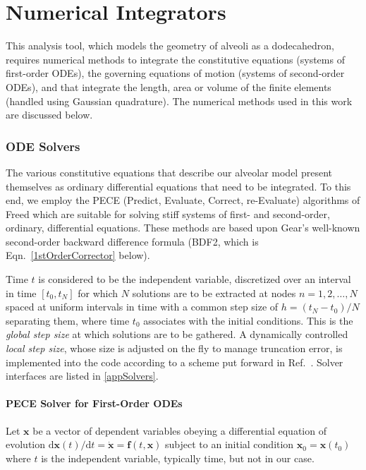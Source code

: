 \part{Numerical Integrators}
\label{partNumericalMethods}

This analysis tool, which models the geometry of alveoli as a dodecahedron, requires numerical methods to integrate the constitutive equations (systems of first-order ODEs), the governing equations of motion (systems of second-order ODEs), and that integrate the length, area or volume of the finite elements (handled using Gaussian quadrature).  The numerical methods used in this work are discussed below.

\section{ODE Solvers}

The various constitutive equations that describe our alveolar model present themselves as ordinary differential equations that need to be integrated.  To this end, we employ the PECE (Predict, Evaluate, Correct, re-Evaluate) algorithms of Freed \cite{Freed17a} which are suitable for solving stiff systems of first- and second-order, ordinary, differential equations.  These methods are based upon Gear's well-known second-order backward difference formula (BDF2, which is Eqn.~\ref{1stOrderCorrector} below).

Time $t$ is considered to be the independent variable, discretized over an interval in time $[t_0, t_N]$ for which $N$ solutions are to be extracted at nodes $n=1, 2, \ldots, N$ spaced at uniform intervals in time with a common step size of $h = (t_N - t_0)/N$ separating them, where time $t_0$ associates with the initial conditions.  This is the \textit{global step size\/} at which solutions are to be gathered.  A dynamically controlled \textit{local step size}, whose size is adjusted on the fly to manage truncation error, is implemented into the code according to a scheme put forward in Ref.~\cite{Soderlind02}.  Solver interfaces are listed in \ref{appSolvers}.

\subsection{PECE Solver for First-Order ODEs}
\label{sec:1stOrderPECE}

Let $\mathbf{x}$ be a vector of dependent variables obeying a differential equation of evolution $\mathrm{d} \mathbf{x}(t) / \mathrm{d} t = \dot{\mathbf{x}} = \mathbf{f} (t, \mathbf{x})$ subject to an initial condition $\mathbf{x}_0 = \mathbf{x}(t_0)$ where $t$ is the independent variable, typically time, but not in our case.

